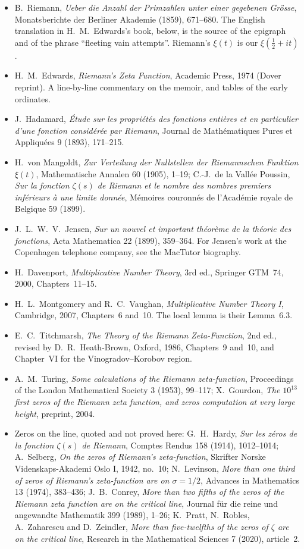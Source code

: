 \begin{itemize}
\item B.~Riemann, \emph{Ueber die Anzahl der Primzahlen unter einer gegebenen Grösse}, Monatsberichte der Berliner Akademie (1859), 671--680. The English translation in H.~M.~Edwards's book, below, is the source of the epigraph and of the phrase ``fleeting vain attempts''. Riemann's $\xi(t)$ is our $\xi(\frac12+it)$.
\item H.~M.~Edwards, \emph{Riemann's Zeta Function}, Academic Press, 1974 (Dover reprint). A line-by-line commentary on the memoir, and tables of the early ordinates.
\item J.~Hadamard, \emph{Étude sur les propriétés des fonctions entières et en particulier d'une fonction considérée par Riemann}, Journal de Mathématiques Pures et Appliquées 9 (1893), 171--215.
\item H.~von Mangoldt, \emph{Zur Verteilung der Nullstellen der Riemannschen Funktion $\xi(t)$}, Mathematische Annalen 60 (1905), 1--19; C.-J.~de la Vallée Poussin, \emph{Sur la fonction $\zeta(s)$ de Riemann et le nombre des nombres premiers inférieurs à une limite donnée}, Mémoires couronnés de l'Académie royale de Belgique 59 (1899).
\item J.~L.~W.~V.~Jensen, \emph{Sur un nouvel et important théorème de la théorie des fonctions}, Acta Mathematica 22 (1899), 359--364. For Jensen's work at the Copenhagen telephone company, see the MacTutor biography.
\item H.~Davenport, \emph{Multiplicative Number Theory}, 3rd ed., Springer GTM~74, 2000, Chapters~11--15.
\item H.~L.~Montgomery and R.~C.~Vaughan, \emph{Multiplicative Number Theory I}, Cambridge, 2007, Chapters~6 and~10. The local lemma is their Lemma~6.3.
\item E.~C.~Titchmarsh, \emph{The Theory of the Riemann Zeta-Function}, 2nd ed., revised by D.~R.~Heath-Brown, Oxford, 1986, Chapters~9 and~10, and Chapter~VI for the Vinogradov--Korobov region.
\item A.~M.~Turing, \emph{Some calculations of the Riemann zeta-function}, Proceedings of the London Mathematical Society 3 (1953), 99--117; X.~Gourdon, \emph{The $10^{13}$ first zeros of the Riemann zeta function, and zeros computation at very large height}, preprint, 2004.
\item Zeros on the line, quoted and not proved here: G.~H.~Hardy, \emph{Sur les zéros de la fonction $\zeta(s)$ de Riemann}, Comptes Rendus 158 (1914), 1012--1014; A.~Selberg, \emph{On the zeros of Riemann's zeta-function}, Skrifter Norske Videnskaps-Akademi Oslo I, 1942, no.~10; N.~Levinson, \emph{More than one third of zeros of Riemann's zeta-function are on $\sigma=1/2$}, Advances in Mathematics 13 (1974), 383--436; J.~B.~Conrey, \emph{More than two fifths of the zeros of the Riemann zeta function are on the critical line}, Journal für die reine und angewandte Mathematik 399 (1989), 1--26; K.~Pratt, N.~Robles, A.~Zaharescu and D.~Zeindler, \emph{More than five-twelfths of the zeros of $\zeta$ are on the critical line}, Research in the Mathematical Sciences 7 (2020), article~2.

\end{itemize}
